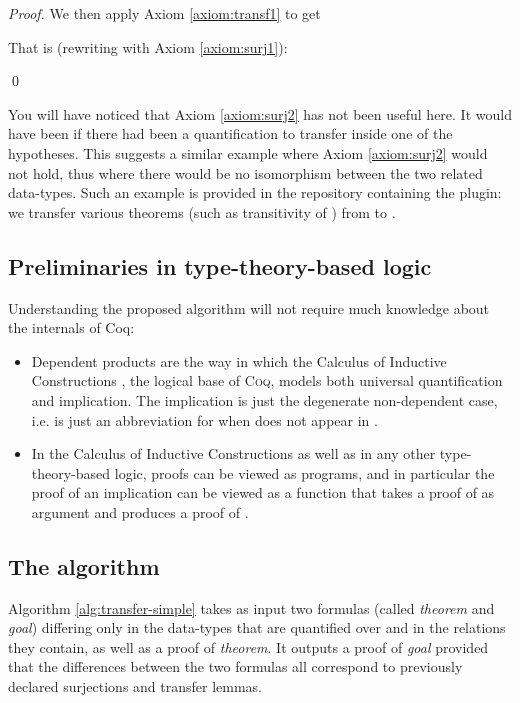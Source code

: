 \documentclass{llncs}
\begin{document}
\begin{example}
\begin{proof}
        We then apply Axiom \ref{axiom:transf1} to get
        
        That is (rewriting with Axiom \ref{axiom:surj1}):
        
        \qed
    \end{proof}

    You will have noticed that Axiom \ref{axiom:surj2} has not been useful here.
    It would have been if there had been a quantification to transfer inside one of the hypotheses.
    This suggests a similar example where Axiom \ref{axiom:surj2} would not hold,
    thus where there would be no isomorphism between the two related data-types.
    Such an example is provided in the repository containing the plugin: we transfer various
    theorems (such as transitivity of ) from  to .

\end{example}

\subsection{Preliminaries in type-theory-based logic}

Understanding the proposed algorithm will not require much knowledge about
the internals of Coq:

\begin{itemize}
\item Dependent products are the way in which the Calculus of Inductive Constructions
\cite[Ch. 4]{Coq:manual}, the logical base of \textsc{Coq},
models both universal quantification and implication. The implication is just the
degenerate non-dependent case,
i.e.  is just an abbreviation for  when  does
not appear in .

\item In the Calculus of Inductive Constructions as well as in
any other type-theory-based logic,
proofs can be viewed as programs, and in particular the proof 
of an implication 
can be viewed as a function that takes a proof  of  as argument
and produces a proof  of .
\end{itemize}

\subsection{The algorithm}

Algorithm \ref{alg:transfer-simple} takes as input two formulas (called \emph{theorem} and \emph{goal})
differing only in the data-types that are quantified over and in the relations they contain,
as well as a proof of \emph{theorem}.
It outputs a proof of \emph{goal} provided that the differences between the two formulas all correspond
to previously declared surjections and transfer lemmas.
\end{document}
